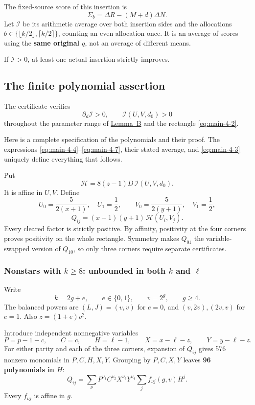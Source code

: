 \documentclass[11pt,reqno]{amsart}
\theoremstyle{plain}
\begin{document}
The fixed-source score of this insertion is \[
\Sigma_b=\Delta R-(M+d)\Delta N.
\] Let \(\mathcal I\) be its arithmetic average over both insertion sides and the allocations \(b\in\{\lfloor k/2\rfloor,\lceil k/2\rceil\}\), counting an even allocation once. It is an average of scores using the \textbf{same original \(q\)}, not an average of different means.

If \(\mathcal I>0\), at least one actual insertion strictly improves.

\subsection{The finite polynomial assertion}\label{the-finite-polynomial-assertion}

The certificate verifies \[
\boxed{\partial_d\mathcal I>0,\qquad
\mathcal I(U,V,d_0)>0}
\tag{4.8}\label{eq:main-4-8}
\] throughout the parameter range of \hyperref[lem:broom]{Lemma~B} and the rectangle \eqref{eq:main-4-2}.

Here is a complete specification of the polynomials and their proof. The expressions \eqref{eq:main-4-4}--\eqref{eq:main-4-7}, their stated average, and \eqref{eq:main-4-3} uniquely define everything that follows.

Put \[
\mathcal H=8(z-1)D\,\mathcal I(U,V,d_0).
\tag{4.9}\label{eq:main-4-9}
\] It is affine in \(U,V\). Define \[
U_0=\frac5{2(x+1)},\quad U_1=\frac12,
\qquad
V_0=\frac5{2(y+1)},\quad V_1=\frac12,
\] \[
Q_{ij}=(x+1)(y+1)\,\mathcal H(U_i,V_j).
\tag{4.10}\label{eq:main-4-10}
\] Every cleared factor is strictly positive. By affinity, positivity at the four corners proves positivity on the whole rectangle. Symmetry makes \(Q_{01}\) the variable-swapped version of \(Q_{10}\), so only three corners require separate certificates.

\subsubsection*{\texorpdfstring{Nonstars with \(k\ge8\): unbounded in both \(k\) and \(\ell\)}{Nonstars with k >= 8: unbounded in k and ell}}\label{nonstars-with-kge8-unbounded-in-both-k-and-ell}

Write \[
k=2g+e,\qquad e\in\{0,1\},\qquad v=2^g,\qquad g\ge4.
\] The balanced powers are \((L,J)=(v,v)\) for \(e=0\), and \((v,2v),(2v,v)\) for \(e=1\). Also \(z=(1+e)v^2\).

Introduce independent nonnegative variables \[
P=p-1-c,\qquad C=c,\qquad H=\ell-1,
\qquad X=x-\ell-z,\qquad Y=y-\ell-z.
\tag{4.11}\label{eq:main-4-11}
\] For either parity and each of the three corners, expansion of \(Q_{ij}\) gives 576 nonzero monomials in \(P,C,H,X,Y\). Grouping by \(P,C,X,Y\) leaves \textbf{96 polynomials in \(H\)}: \[
Q_{ij}=\sum_{\nu}P^{\nu_1}C^{\nu_2}X^{\nu_3}Y^{\nu_4}
       \sum_j f_{\nu j}(g,v)H^j.
\tag{4.12}\label{eq:main-4-12}
\] Every \(f_{\nu j}\) is affine in \(g\).
\end{document}
